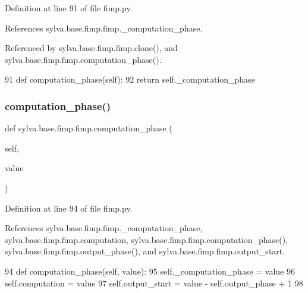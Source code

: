 Definition at line 91 of file fimp.\+py.



References sylva.\+base.\+fimp.\+fimp.\+\_\+computation\+\_\+phase.



Referenced by sylva.\+base.\+fimp.\+fimp.\+clone(), and sylva.\+base.\+fimp.\+fimp.\+computation\+\_\+phase().


\begin{DoxyCode}
91     \textcolor{keyword}{def }computation\_phase(self):
92       \textcolor{keywordflow}{return} self.\_computation\_phase
\end{DoxyCode}
\mbox{\label{classsylva_1_1base_1_1fimp_1_1fimp_a92fa2219d6caa3808d89a8d0a5734a7b}} 
\subsubsection{\texorpdfstring{computation\+\_\+phase()}{computation\_phase()}\hspace{0.1cm}{\footnotesize\ttfamily [2/2]}}
{\footnotesize\ttfamily def sylva.\+base.\+fimp.\+fimp.\+computation\+\_\+phase (\begin{DoxyParamCaption}\item[{}]{self,  }\item[{}]{value }\end{DoxyParamCaption})}



Definition at line 94 of file fimp.\+py.



References sylva.\+base.\+fimp.\+fimp.\+\_\+computation\+\_\+phase, sylva.\+base.\+fimp.\+fimp.\+computation, sylva.\+base.\+fimp.\+fimp.\+computation\+\_\+phase(), sylva.\+base.\+fimp.\+fimp.\+output\+\_\+phase(), and sylva.\+base.\+fimp.\+fimp.\+output\+\_\+start.


\begin{DoxyCode}
94     \textcolor{keyword}{def }computation\_phase(self, value):
95       self.\_computation\_phase = value
96       self.computation = value
97       self.output\_start = value - self.output\_phase + 1
98 
\end{DoxyCode}
\mbox{\label{classsylva_1_1base_1_1fimp_1_1fimp_a2b18eae17590cf778d6367c1681bc3ef}} 
